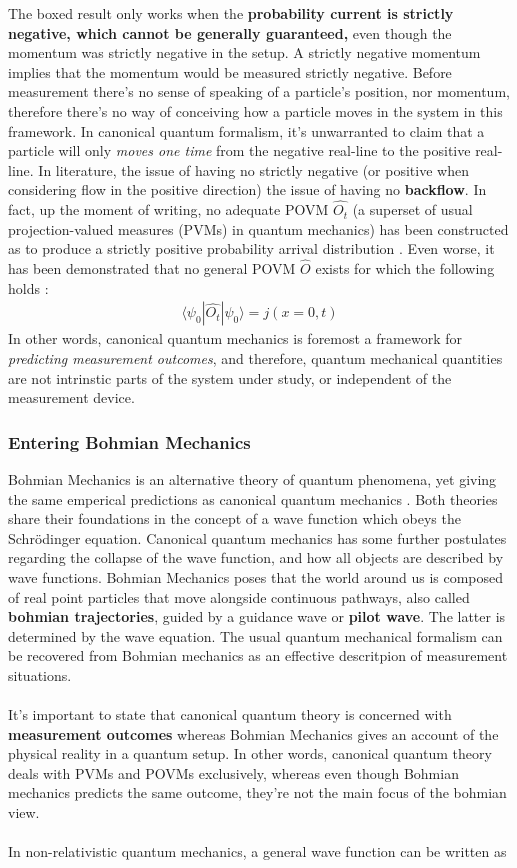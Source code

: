The boxed result only works when the \textbf{probability current is strictly negative, which cannot be generally guaranteed,} even though the momentum was strictly negative in the setup. A strictly negative momentum implies that the momentum would be measured strictly negative. Before measurement there's no sense of speaking of a particle's position, nor momentum, therefore there's no way of conceiving how a particle moves in the system in this framework. In canonical quantum formalism, it's unwarranted to claim that a particle will only \textit{moves one time} from the negative real-line to the positive real-line. In literature, the issue of having no strictly negative (or positive when considering flow in the positive direction) the issue of having no \textbf{backflow}. In fact, up the moment of writing, no adequate POVM $\hat{O_t}$ (a superset of usual projection-valued measures (PVMs) in quantum mechanics) has been constructed as to produce a strictly positive probability arrival distribution \cite{MUGA2000353}. Even worse, it has been demonstrated that no general POVM $\hat{O}$ exists for which the following holds \cite{Vona_2013}:
\begin{align}
\langle \psi_0 | \hat{O_t} | \psi_0 \rangle = j(x=0, t)
\end{align}
In other words, canonical quantum mechanics is foremost a framework for \textit{predicting measurement outcomes}, and therefore, quantum mechanical quantities are not intrinstic parts of the system under study, or independent of the measurement device.

\subsubsection{Entering Bohmian Mechanics}

Bohmian Mechanics is an alternative theory of quantum phenomena, yet giving the same emperical predictions as canonical quantum mechanics \cite{DurrTeufel2009} \cite{DurrGoldsteinZanghi2013}. Both theories share their foundations in the concept of a wave function which obeys the Schrödinger equation. Canonical quantum mechanics has some further postulates regarding the collapse of the wave function, and how all objects are described by wave functions. Bohmian Mechanics poses that the world around us is composed of real point particles that move alongside continuous pathways, also called \textbf{bohmian trajectories}, guided by a guidance wave or \textbf{pilot wave}. The latter is determined by the wave equation. The usual quantum mechanical formalism can be recovered from Bohmian mechanics as an effective descritpion of measurement situations.
\\\\
It's important to state that canonical quantum theory is concerned with \textbf{measurement outcomes} whereas Bohmian Mechanics gives an account of the physical reality in a quantum setup. In other words, canonical quantum theory deals with PVMs and POVMs exclusively, whereas even though Bohmian mechanics predicts the same outcome, they're not the main focus of the bohmian view.
\\\\
In non-relativistic quantum mechanics, a general wave function can be written as

